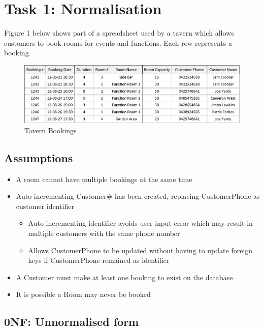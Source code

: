 \section{Task 1: Normalisation}

Figure 1 below shows part of a spreadsheet used by a tavern which allows customers to book rooms for events and functions. Each row represents a booking.

\begin{figure}[H]
\centering
\caption{Tavern Bookings}
\includegraphics[scale=0.8]{./img/task1.pdf}
\end{figure}

\subsection{Assumptions}

\begin{itemize}
\item A room cannot have multiple bookings at the same time
\item Auto-incrementing Customer\# has been created, replacing CustomerPhone as customer identifier
	\begin{itemize}
	\item Auto-incrementing identifier avoids user input error which may result in multiple customers with the same phone number
	\item Allows CustomerPhone to be updated without having to update foreign keys if CustomerPhone remained as identifier
	\end{itemize}
\item A Customer must make at least one booking to exist on the database
\item It is possible a Room may never be booked
\end{itemize}

\subsection{0NF: Unnormalised form}

